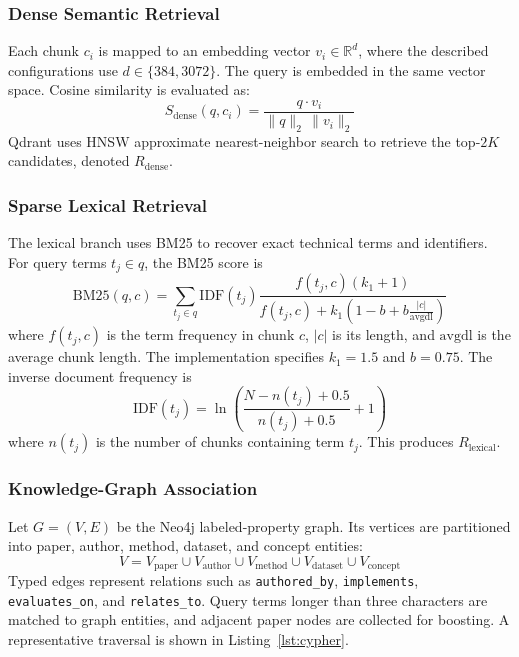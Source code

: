 \documentclass[conference]{IEEEtran}
\begin{document}
\subsubsection{Dense Semantic Retrieval}
Each chunk $c_i$ is mapped to an embedding vector $v_i \in \mathbb{R}^d$, where the described configurations use $d \in \{384, 3072\}$. The query is embedded in the same vector space. Cosine similarity is evaluated as:
\begin{equation}
S_{\mathrm{dense}}(q, c_i) = \frac{q \cdot v_i}{\|q\|_2 \, \|v_i\|_2}
\label{eq:cosine}
\end{equation}
Qdrant uses HNSW approximate nearest-neighbor search to retrieve the top-$2K$ candidates, denoted $R_{\mathrm{dense}}$.

\subsubsection{Sparse Lexical Retrieval}
The lexical branch uses BM25 to recover exact technical terms and identifiers. For query terms $t_j \in q$, the BM25 score is
\begin{equation}
\mathrm{BM25}(q, c) = \sum_{t_j \in q} \mathrm{IDF}(t_j) \frac{f(t_j, c)(k_1 + 1)}{f(t_j, c) + k_1\left(1 - b + b\frac{|c|}{\mathrm{avgdl}}\right)}
\label{eq:bm25}
\end{equation}
where $f(t_j, c)$ is the term frequency in chunk $c$, $|c|$ is its length, and $\mathrm{avgdl}$ is the average chunk length. The implementation specifies $k_1 = 1.5$ and $b = 0.75$. The inverse document frequency is
\begin{equation}
\mathrm{IDF}(t_j) = \ln\left(\frac{N - n(t_j) + 0.5}{n(t_j) + 0.5} + 1\right)
\label{eq:idf}
\end{equation}
where $n(t_j)$ is the number of chunks containing term $t_j$. This produces $R_{\mathrm{lexical}}$.

\subsubsection{Knowledge-Graph Association}
Let $G = (V, E)$ be the Neo4j labeled-property graph. Its vertices are partitioned into paper, author, method, dataset, and concept entities:
\begin{equation}
V = V_{\mathrm{paper}} \cup V_{\mathrm{author}} \cup V_{\mathrm{method}} \cup V_{\mathrm{dataset}} \cup V_{\mathrm{concept}}
\label{eq:vertices}
\end{equation}
Typed edges represent relations such as \texttt{authored\_by}, \texttt{implements}, \texttt{evaluates\_on}, and \texttt{relates\_to}. Query terms longer than three characters are matched to graph entities, and adjacent paper nodes are collected for boosting. A representative traversal is shown in Listing~\ref{lst:cypher}.
\end{document}
